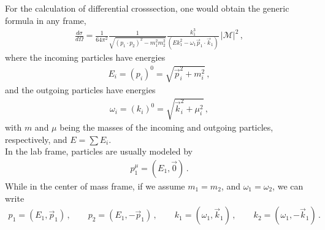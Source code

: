 \documentclass[11pt, onesided]{book}
\theoremstyle{break}
\theoremstyle{break}
\begin{document}
For the calculation of differential crosssection, one would obtain the generic formula in any frame,
\begin{align*}
\frac{d\sigma}{d\Omega} = \frac{1}{64\pi^2}\frac{1}{\sqrt{(p_1 \cdot p_2)^2 - m_1^2 m_2^2}} \frac{k_1^3}{(Ek_1^2-\omega_1 \vec{p}_1 \cdot \vec{k}_1)}\, |\mathcal{M}|^2\,,
\end{align*}
where the incoming particles have energies
\begin{align*}
E_i = (p_i)^{0} = \sqrt{\vec{p}_i^2 + m_i^2}\,,
\end{align*}
and the outgoing particles have energies
\begin{align*}
\omega_i = (k_i)^0 = \sqrt{\vec{k}_i^2 + \mu_i^2}\,,
\end{align*}
with $m$ and $\mu$ being the masses of the incoming and outgoing particles, respectively, and $E =\sum E_i$. \\

In the lab frame, particles are usually modeled by
\begin{align*}
p_1^\mu = (E_1, \vec{0})\,.
\end{align*}
While in the center of mass frame, if we assume $m_1 = m_2$, and $\omega_1 = \omega_2$, we can write
\begin{align*}
p_1 = (E_1, \vec{p}_1) \,,\qquad
p_2 = (E_1, - \vec{p}_1)\,,\qquad  
k_1 = (\omega_1, \vec{k}_1)\,,\qquad
k_2 = (\omega_1, -\vec{k}_1)\,.
\end{align*}
\end{document}

